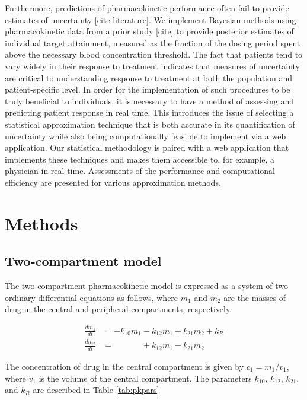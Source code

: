 \documentclass{article}
\begin{document}
Furthermore, predictions of pharmacokinetic performance often fail to provide estimates of uncertainty [cite literature]. We implement Bayesian methods using pharmacokinetic data from a prior study [cite] to provide posterior estimates of individual  target attainment, measured as the fraction of the dosing period spent above the necessary blood concentration threshold. The fact that patients tend to vary widely in their response to treatment indicates that measures of uncertainty are critical to understanding response to treatment at both the population and patient-specific level. In order for the implementation of such procedures to be truly beneficial to individuals, it is necessary to have a method of assessing and predicting patient response in real time. This introduces the issue of selecting a statistical approximation technique that is both accurate in its quantification of uncertainty while also being computationally feasible to implement via a web application. Our statistical methodology is paired with a web application that implements these techniques and makes them accessible to, for example, a physician in real time. Assessments of the performance and computational efficiency are presented for various approximation methods.

\section{Methods}
\subsection{Two-compartment model}
The two-compartment pharmacokinetic model is expressed as a system of two ordinary differential equations as follows, where $m_1$ and $m_2$ are the masses of drug in the central and peripheral compartments, respectively.

\begin{align}
\frac{dm_1}{dt} &= -k_{10}m_1 - k_{12}m_1 + k_{21}m_2 + k_R \nonumber \\
\frac{dm_2}{dt} &= \phantom{-k_{10}m_1} + k_{12}m_1 - k_{21}m_2 \nonumber
\end{align}

The concentration of drug in the central compartment is given by $c_1 = m_1/v_1$, where $v_1$ is the volume of the central compartment. The parameters $k_{10}$, $k_{12}$, $k_{21}$, and $k_R$ are described in Table \ref{tab:pkpars}
\end{document}
